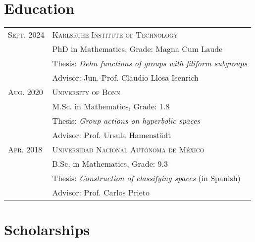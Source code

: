 \documentclass[a4paper,11pt]{article} %
\begin{document}

\section{Education}

\begin{longtable}{>{\raggedleft\arraybackslash}p{4cm}p{10cm}}
\textsc{Sept.} 2024 & \textsc{Karlsruhe Institute of Technology} \vspace{0.3em} \\
& PhD in Mathematics, Grade: Magna Cum Laude \vspace{0.3em}\\
& \quad Thesis: \emph{Dehn functions of groups with filiform subgroups}\\ 
& \quad Advisor: Jun.-Prof. Claudio Llosa Isenrich \vspace{0.5em}\\

\textsc{Aug.} 2020& \textsc{University of Bonn} \vspace{0.3em}\\
&M.Sc. in Mathematics, Grade: 1.8 \vspace{0.3em}\\
& \quad Thesis: \emph{Group actions on hyperbolic spaces}\\ 
& \quad Advisor: Prof. Ursula Hamenstädt \vspace{0.5em}\\

\textsc{Apr.} 2018& \textsc{Universidad Nacional Autónoma de México} \vspace{0.3em}\\ 
& B.Sc. in Mathematics, Grade: 9.3 \vspace{0.3em}\\
& \quad Thesis: \emph{Construction of classifying spaces} (in Spanish)\\ 
& \quad Advisor: Prof. Carlos Prieto\\
\end{longtable}


\section{Scholarships}
\end{document}
